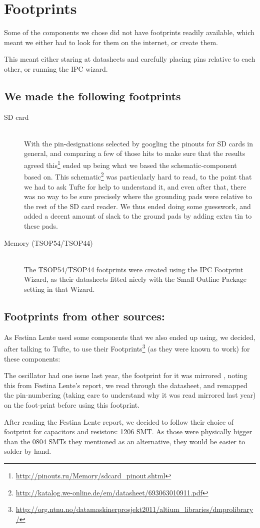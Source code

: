 \section {Footprints}
Some of the components we chose did not have footprints readily available, which
meant we either had to look for them on the internet, or create them.

This meant either staring at datasheets and carefully placing pins
relative to each other, or running the IPC wizard.

\subsection{We made the following footprints}

\begin{description}
\item[SD card] \hfill
\\
  With the pin-designations selected by googling the pinouts for
  \ac{SD} cards in general, and comparing a few of those hits to make sure that
  the results agreed
  this\footnote{\url{http://pinouts.ru/Memory/sdcard_pinout.shtml}} ended up
  being what we based the schematic-component based on. This
  schematic\footnote{\url{http://katalog.we-online.de/em/datasheet/693063010911.pdf}}
  was particularly hard to read, to the point that we had to ask Tufte
  for help to understand it, and even after that, there was no way to be sure
  precisely where the grounding pads were relative to the rest of the \ac{SD}
  card reader. We thus ended doing some guesswork, and added a decent amount
  of slack to the ground pads by adding extra tin to these pads.
\item[Memory (TSOP54/TSOP44)] \hfill
\\
  The TSOP54/TSOP44 footprints were created using
  the IPC Footprint Wizard, as their datasheets fitted nicely with the Small
  Outline Package setting in that Wizard.
\end{description}

\subsection{Footprints from other sources:}
As Festina Lente used some components that we also ended up using, we decided,
after talking to Tufte, to use their Footprints\footnote{\url{http://org.ntnu.no/datamaskinerprosjekt2011/altium_libraries/dmprolibrary/}}
(as they were known to work) for these components:


The oscillator had one issue last year, the footprint for it was mirrored
, noting this from Festina Lente's report, we read
through the datasheet, and remapped the pin-numbering (taking care to understand
why it was read mirrored last year) on the foot-print 
before using this footprint.

After reading the Festina Lente report\cite{berg2011festinalente}, we decided to
follow their choice of footprint for capacitors and resistors: 1206 SMT. As
those were physically bigger than the 0804 SMTs they mentioned as an
alternative, they would be easier to solder by hand.
